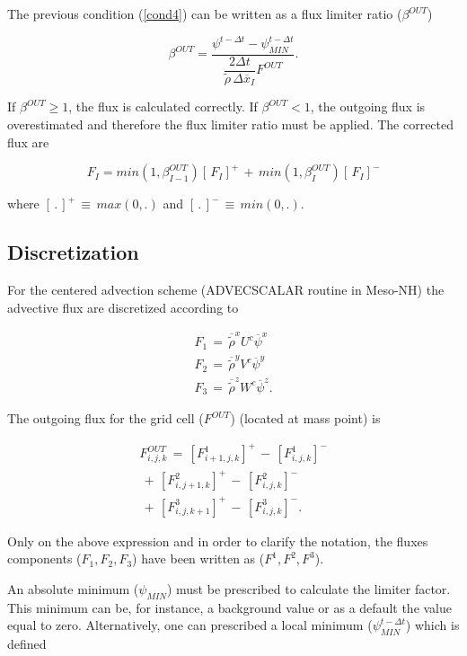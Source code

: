 The previous condition (\ref{cond4}) can be written as a flux limiter ratio ($\beta^{OUT}$)

\begin{equation}
\beta^{OUT}=
 \dfrac{ \psi^{t-\Delta t}- \psi_{MIN}^{t-\Delta t} }
{ \dfrac{2 \Delta t}{\tilde{\rho}\,\Delta \overline{x}_{I}} {F}^{OUT}}.
\end{equation}

If $\beta^{OUT} \geq 1$, the flux is calculated correctly.
If $\beta^{OUT}<1$, the outgoing flux is overestimated and therefore the flux limiter
ratio must be applied.
The corrected flux are

\begin{equation}
\label{cond5}
{F}_{I} = min(1,\beta^{OUT}_{I-1})[\,F_{I}]^{+}\,+\,
min(1,\beta^{OUT}_{I})[\,F_{I}]^{-}
\end{equation}

\noindent where $[\,.\,]^{+}\,\equiv\, max(0,.)$ and $[\,.\,]^{-}\,\equiv\,min(0,.)$.

\subsection{Discretization}

For the centered advection scheme (ADVECSCALAR routine in Meso-NH) the advective
flux are discretized according to

\begin{eqnarray}
F_1\,=\,
\overline{\tilde{\rho}}^{x}U^{c} \overline{\psi}^{x} \\
F_2\,=\,
\overline{\tilde{\rho}}^{y}V^{c} \overline{\psi}^{y} \\
F_3\,=\,
\overline{\tilde{\rho}}^{z}W^{c} \overline{\psi}^{z}.
\end{eqnarray}

The outgoing flux for the grid cell ($F^{OUT}$) (located at mass point) is

\begin{eqnarray}
F^{OUT}_{i,j,k}\,=\,[F^1_{i+1,j,k}]^+\,-\,[F^1_{i,j,k}]^-
\nonumber \\
\,+\,[F^2_{i,j+1,k}]^+\,-\,[F^2_{i,j,k}]^-
\nonumber \\
\,+\,[F^3_{i,j,k+1}]^+\,-\,[F^3_{i,j,k}]^-.
\end{eqnarray}

Only on the above expression and in order to clarify the notation, the fluxes
components ($F_1,F_2,F_3$) have been written as ($F^1,F^2,F^3$).

An absolute minimum ($\psi_{MIN}$) must be prescribed to calculate the limiter factor.
This minimum can be, for instance, a
background value or as a default the value equal to zero.
Alternatively, one can prescribed a local minimum ($\psi_{MIN}^{t-\Delta {t}}$)
which is defined


